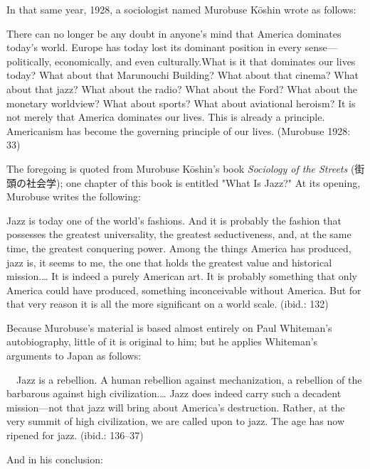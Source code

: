 In that same year, 1928, a sociologist named Murobuse Kōshin wrote as follows:

\begin{gquote}
There can no longer be any doubt in anyone's mind that America dominates today's world. Europe has today lost its dominant position in every sense—politically, economically, and even culturally.What is it that dominates our lives today? What about that Marunouchi Building? What about that cinema? What about that jazz? What about the radio? What about the Ford? What about the monetary worldview? What about sports? What about aviational heroism? It is not merely that America dominates our lives. This is already a principle. Americanism has become the governing principle of our lives. (Murobuse 1928: 33)
\end{gquote}

The foregoing is quoted from Murobuse Kōshin's book \textit{Sociology of the Streets} (街頭の社会学); one chapter of this book is entitled "What Is Jazz?" At its opening, Murobuse writes the following:

\begin{gquote}
Jazz is today one of the world's fashions. And it is probably the fashion that possesses the greatest universality, the greatest seductiveness, and, at the same time, the greatest conquering power. Among the things America has produced, jazz is, it seems to me, the one that holds the greatest value and historical mission.… It is indeed a purely American art. It is probably something that only America could have produced, something inconceivable without America. But for that very reason it is all the more significant on a world scale. (ibid.: 132)
\end{gquote}

Because Murobuse's material is based almost entirely on Paul Whiteman's autobiography, little of it is original to him; but he applies Whiteman's arguments to Japan as follows:

\begin{gquote}
　Jazz is a rebellion. A human rebellion against mechanization, a rebellion of the barbarous against high civilization.… Jazz does indeed carry such a decadent mission—not that jazz will bring about America's destruction. Rather, at the very summit of high civilization, we are called upon to jazz. The age has now ripened for jazz. (ibid.: 136–37)
\end{gquote}

And in his conclusion:

